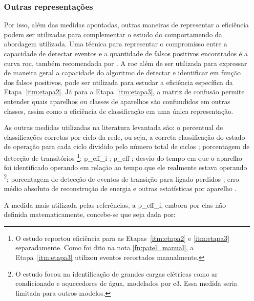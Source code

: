 \subsubsection{Outras representações}
\label{top:outras_eff}

Por isso, além das medidas apontadas, outras maneiras de representar
a eficiência podem ser utilizadas para complementar o estudo do
comportamendo da abordagem utilizada. Uma técnica para representar o
compromisso entre a capacidade de detectar eventos e a quantidade de
falsos positivos encontrados é a curva \gls{roc}, também recomendada
por \cite{nilm_zeifman_review_2011}. A \gls{roc} além de ser utilizada
para expressar de maneira geral a capacidade do algoritmo de detectar
e identificar em função dos falsos positivos, pode ser utilizada para
estudar a eficiência específica da Etapa~\ref{itm:etapa2}. Já para a
Etapa~\ref{itm:etapa3}, a matriz de confusão permite entender quais
aparelhos ou classes de aparelhos são confundidos em outras classes,
assim como a eficiência de classificação em uma única representação.

As outras medidas utilizadas na literatura levantada são: o
percentual de classificações corretas por ciclo da rede, ou seja, a
correta classificação do estado de operação para cada ciclo dividido
pelo número total de ciclos
\cite{nilm_srinivasan_nn_2006_27,nilm_suzuki_2011_35}; porcentagem de
detecção de transitórios \cite{nilm_patel_2007_29}\footnote{O estudo
reportou eficiência para as Etapas~\ref{itm:etapa2} e \ref{itm:etapa3}
separadamente. Como foi dito na nota \ref{fn:patel_manual}, a
Etapa~\ref{itm:etapa3} utilizou eventos recortados manualmente.};
\gls{p_eff_i}
\cite{nilm_hart_1992_8,nilm_cole_data_extraction_1998_14,
nilm_cole_extra_info_surge_1998_15,nilm_farinaccio_16ssamp_1999_17,
nilm_marceau_16ssamp_improved_1999_18}; \gls{p_eff} 
\cite{2010_nilm_melhorando_pph_usa_37}; desvio
do tempo em que o aparelho foi identificado operando em relação ao
tempo que ele realmente estava operando
\cite{nilm_farinaccio_16ssamp_1999_17}\footnote{O estudo focou na
identificação de grandes cargas elétricas como ar condicionado e
aquecedores de água, modelados por \gls{c3}\label{fn:valc3}. Essa
medida seria limitada para outros modelos.}; porcentagem de detecção
de eventos de transição para ligado perdidos
\cite{nilm_farinaccio_16ssamp_1999_17}; erro médio
absoluto de reconstrução de energia e outras estatísticas por aparelho
\cite{nilm_powers_15minsamp_1991_16}.

A medida mais utilizada pelas referências, a \gls{p_eff_i}, embora
por elas não definida matematicamente, concebe-se que seja dada por:

